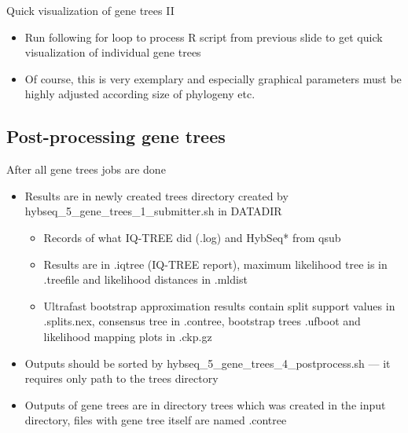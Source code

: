 \documentclass[compress, ucs, xelatex, 11pt, xcolor=x11names, aspectratio=169,
	hyperref={
		bookmarks=true,
		unicode=true,
		colorlinks=true,
		pdftitle={HybSeq course},
		plainpages=false,
		pdfauthor={Vojtech Zeisek},
		pdfsubject={Practical processing of HybSeq target enrichment sequencing data on computing grids like MetaCentrum},
		pdfcreator={XeLaTeX},
		pdfkeywords={BASH, command line, GNU, HybSeq, Linux, MetaCentrum, sequencing shell, target enrichment},
		linkcolor=Turquoise4, %
		anchorcolor=DodgerBlue4, %
		citecolor=DodgerBlue4, %
		filecolor=DodgerBlue4, %
		menucolor=Tan4, %
		urlcolor=DarkOliveGreen4, %
		pdftex},
	url={hyphens, lowtilde} %
	]{beamer}
\renewcommand{\texttt}[1]{\colorbox{Cornsilk2}{{\ttfamily #1}}}
\begin{document}
\begin{frame}[fragile]{Quick visualization of gene trees II}
	\begin{itemize}
		\item Run following \texttt{for} loop to process \texttt{R} script from previous slide to get quick visualization of individual gene trees
		\item Of course, this is very exemplary and especially graphical parameters must be highly adjusted according size of phylogeny etc.
	\end{itemize}
\end{frame}

\subsection{Post-processing gene trees}

\begin{frame}{After all gene trees jobs are done}
	\begin{itemize}
		\item Results are in newly created \texttt{trees} directory created by \texttt{hybseq\_5\_gene\_trees\_1\_submitter.sh} in \texttt{DATADIR}
		\begin{itemize}
			\item Records of what IQ-TREE did (\texttt{*.log}) and \texttt{HybSeq*} from \texttt{qsub}
			\item Results are in \texttt{*.iqtree} (IQ-TREE report), maximum likelihood tree is in \texttt{*.treefile} and likelihood distances in \texttt{*.mldist}
			\item Ultrafast bootstrap approximation results contain split support values in \texttt{*.splits.nex}, consensus tree in \texttt{*.contree}, bootstrap trees \texttt{*.ufboot} and likelihood mapping plots in \texttt{*.ckp.gz}
		\end{itemize}
		\item Outputs should be sorted by \texttt{hybseq\_5\_gene\_trees\_4\_postprocess.sh} --- it requires only path to the \texttt{trees} directory
		\item Outputs of gene trees are in directory \texttt{trees} which was created in the input directory, files with gene tree itself are named \texttt{*.contree}
	\end{itemize}
\end{frame}
\end{document}
